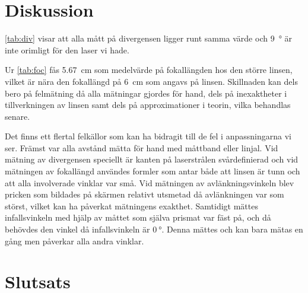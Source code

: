 \documentclass[a4paper]{article}
\begin{document}
\FloatBarrier

\section{Diskussion}
  
\autoref{tab:div} visar att alla mått på divergensen ligger runt samma värde och \SI{9}{\degree} är inte orimligt för den laser vi hade.

Ur \autoref{tab:foc} fås \SI{5.67}{\centi\meter} som medelvärde på fokallängden hos den större linsen, vilket är nära den fokallängd på \SI{6}{\centi\meter} som angavs på linsen. Skillnaden kan dels bero på felmätning då alla mätningar gjordes för hand, dels på inexaktheter i tillverkningen av linsen samt dels på approximationer i teorin, vilka behandlas senare.
  
  
  
  
  
  

  Det finns ett flertal felkällor som kan ha bidragit till de fel i anpassningarna vi ser. Främst var alla avstånd mätta för hand med måttband eller linjal. Vid mätning av divergensen speciellt är kanten på laserstrålen svårdefinierad och vid mätningen av fokallängd användes formler som antar både att linsen är tunn och att alla involverade vinklar var små. Vid mätningen av avlänkningsvinkeln blev pricken som bildades på skärmen relativt utsmetad då avlänkningen var som störst, vilket kan ha påverkat mätningens exakthet. Samtidigt mättes infallsvinkeln med hjälp av måttet som själva prismat var fäst på, och då behövdes den vinkel då infallsvinkeln är $\SI{0}{\degree}$. Denna mättes och kan bara mätas en gång men påverkar alla andra vinklar.
  

\section{Slutsats}
\end{document}
